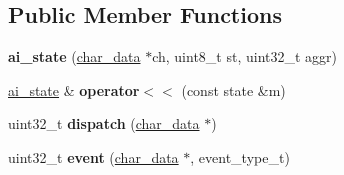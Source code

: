 \subsection*{Public Member Functions}
\begin{DoxyCompactItemize}
\item 
\mbox{\label{classmods_1_1ai__state_a5420e46c2d616b588e8ebbe5b47ee435}} 
{\bfseries ai\+\_\+state} (\hyperlink{structchar__data}{char\+\_\+data} $\ast$ch, uint8\+\_\+t st, uint32\+\_\+t aggr)
\item 
\mbox{\label{classmods_1_1ai__state_a98d1f297666c1fbefa3f6f1c93051dd0}} 
\hyperlink{classmods_1_1ai__state}{ai\+\_\+state} \& {\bfseries operator$<$$<$} (const state \&m)
\item 
\mbox{\label{classmods_1_1ai__state_a2c153b46ee1bb2021d238c1df4ba1dcd}} 
uint32\+\_\+t {\bfseries dispatch} (\hyperlink{structchar__data}{char\+\_\+data} $\ast$)
\item 
\mbox{\label{classmods_1_1ai__state_ae53bc55732fd5ce46229ac5523541d09}} 
uint32\+\_\+t {\bfseries event} (\hyperlink{structchar__data}{char\+\_\+data} $\ast$, event\+\_\+type\+\_\+t)
\end{DoxyCompactItemize}
